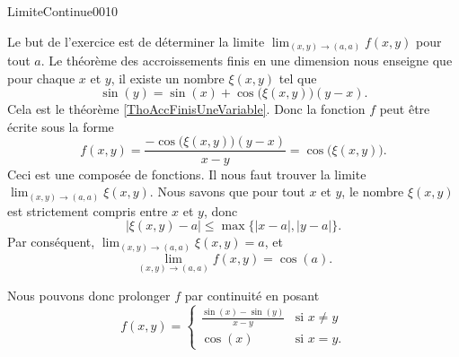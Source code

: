 \begin{corrige}{LimiteContinue0010}


Le but de l'exercice est de déterminer la limite $\lim_{(x,y)\to(a,a)}f(x,y)$ pour tout $a$. Le théorème des accroissements finis en une dimension nous enseigne que pour chaque $x$ et $y$, il existe un nombre $\xi(x,y)$ tel que
\begin{equation}
	\sin(y)=\sin(x)+\cos\big( \xi(x,y) \big)(y-x).
\end{equation}
Cela est le théorème \ref{ThoAccFinisUneVariable}. Donc la fonction $f$ peut être écrite sous la forme
\begin{equation}
	f(x,y)=\frac{ -\cos\big( \xi(x,y) \big)(y-x) }{ x-y }=\cos\big( \xi(x,y) \big).
\end{equation}
Ceci est une composée de fonctions. Il nous faut trouver la limite $\lim_{(x,y)\to(a,a)}\xi(x,y)$. Nous savons que pour tout $x$ et $y$, le nombre $\xi(x,y)$ est strictement compris entre $x$ et $y$, donc
\begin{equation}
	\big| \xi(x,y)-a \big|\leq\max\big\{ | x-a |,| y-a | \big\}.
\end{equation}
Par conséquent, $\lim_{(x,y)\to(a,a)}\xi(x,y)=a$, et
\begin{equation}
	\lim_{(x,y)\to(a,a)}f(x,y)=\cos(a).
\end{equation}

Nous pouvons donc prolonger $f$ par continuité en posant
\begin{equation}
	f(x,y)=\begin{cases}
		\displaystyle\frac{ \sin(x)-\sin(y) }{ x-y }	&	\text{si $x\neq y$}\\
		\cos(x)	&	 \text{si $x=y$.}
	\end{cases}
\end{equation}

\end{corrige}
